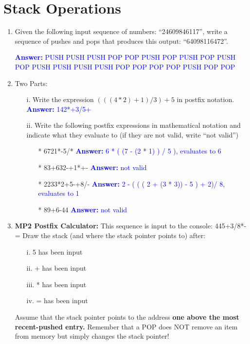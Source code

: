 \documentclass{article}
\begin{document}
\section{Stack Operations}
\begin{enumerate}[label=(\alph*)]
    \item Given the following input sequence of numbers: “24609846117”, write a sequence of pushes and pops that produces this output: “64098116472”.

    \textcolor{blue}{\textbf{Answer: } PUSH PUSH PUSH POP POP PUSH POP PUSH POP PUSH POP PUSH PUSH PUSH PUSH POP POP POP POP PUSH POP POP}


    \item Two Parts:
    \begin{enumerate}[label=()]
        \item[i.] Write the expression    $(  ( (4 * 2) + 1 ) / 3) + 5$ in postfix notation. \newline
        \textcolor{blue}{\textbf{Answer: } 142*+3/5+}
        \item[ii.] Write the following postfix expressions in mathematical notation and indicate what they evaluate to (if they are not valid, write “not valid”)
        \begin{enumerate}
            \item[*] 6721*-5/* \newline
            \textcolor{blue}{\textbf{Answer:}  6 *  ( (7 - (2 * 1) ) / 5 ), evaluates to 6
 }
            \item[*] 83+632-+1*+- \newline
            \textcolor{blue}{\textbf{Answer:} not valid }
            \item[*] 2233*2+5-+8/- \newline
            \textcolor{blue}{\textbf{Answer:} 2 -  ( ( (   2 + (3 * 3)) - 5 ) + 2)/ 8, evaluates to 1 }
            \item[*] 89+6-44 \newline
            \textcolor{blue}{\textbf{Answer:}  not valid}
        \end{enumerate}
    \end{enumerate}


    \item \textbf{MP2 Postfix Calculator:} This sequence is input to the console: 445+3/8*-= Draw the stack (and where the stack pointer points to) after:

    \begin{enumerate}
        \item[i.] 5 has been input
        \item[ii.] + has been input
        \item[iii.] * has been input
        \item[iv.] = has been input
    \end{enumerate}
    Assume that the stack pointer points to the address \textbf{one above the most recent-pushed entry.} Remember that a POP does NOT remove an item from memory but simply changes the stack pointer!
    \newpage


\end{enumerate}
\end{document}
